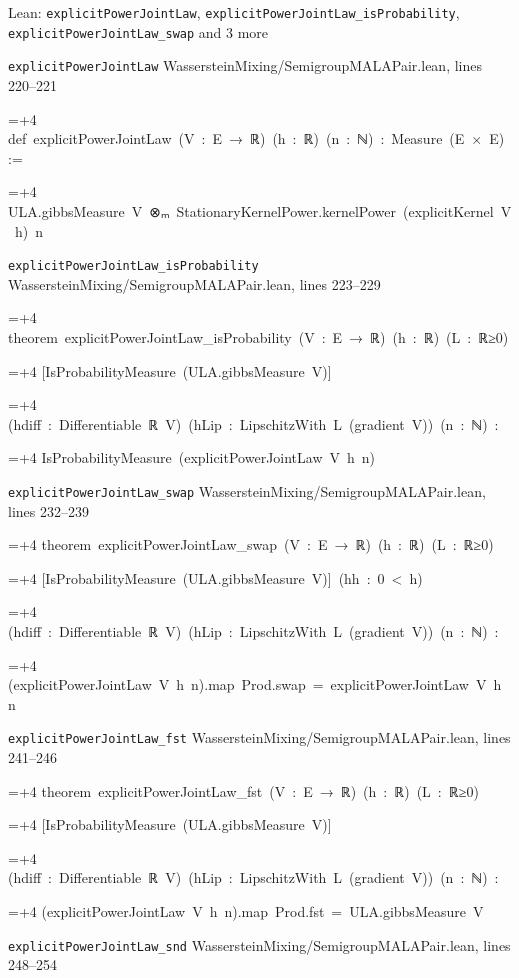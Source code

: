 \documentclass[11pt,a4paper]{report}
\newlength{\leancharwidth}
\newenvironment{leancode}{\par\smallskip\begingroup\ttfamily\footnotesize\raggedright
  \settowidth{\leancharwidth}{M}\setlength{\parskip}{0pt}\setlength{\parindent}{0pt}
  \frenchspacing}{\par\endgroup\smallskip}
\newcommand{\leanline}[2]{\hangindent=\dimexpr#1\leancharwidth+4\leancharwidth\relax
  \hangafter=1\noindent\hspace*{#1\leancharwidth}#2\par}
\newcommand{\leansource}[1]{\par{\footnotesize\color{leanmuted}#1}\par}
\begin{document}
\begin{leanbox}{Lean: \texttt{explicitPowerJointLaw}, \texttt{explicitPowerJointLaw\_\allowbreak{}isProbability}, \texttt{explicitPowerJointLaw\_\allowbreak{}swap} and 3 more}
\leansource{\texttt{explicitPowerJointLaw} \quad WassersteinMixing/\allowbreak{}SemigroupMALAPair.lean, lines 220–221}
\begin{leancode}
\leanline{0}{def\ explicitPowerJointLaw\ (V\ :\ E\ →\ ℝ)\ (h\ :\ ℝ)\ (n\ :\ ℕ)\ :\ Measure\ (E\ ×\ E)\ :=}
\leanline{2}{ULA.gibbsMeasure\ V\ ⊗ₘ\ StationaryKernelPower.kernelPower\ (explicitKernel\ V\ h)\ n}
\end{leancode}
\leansource{\texttt{explicitPowerJointLaw\_\allowbreak{}isProbability} \quad WassersteinMixing/\allowbreak{}SemigroupMALAPair.lean, lines 223–229}
\begin{leancode}
\leanline{0}{theorem\ explicitPowerJointLaw\_isProbability\ (V\ :\ E\ →\ ℝ)\ (h\ :\ ℝ)\ (L\ :\ ℝ≥0)}
\leanline{4}{[IsProbabilityMeasure\ (ULA.gibbsMeasure\ V)]}
\leanline{4}{(hdiff\ :\ Differentiable\ ℝ\ V)\ (hLip\ :\ LipschitzWith\ L\ (gradient\ V))\ (n\ :\ ℕ)\ :}
\leanline{4}{IsProbabilityMeasure\ (explicitPowerJointLaw\ V\ h\ n)}
\end{leancode}
\leansource{\texttt{explicitPowerJointLaw\_\allowbreak{}swap} \quad WassersteinMixing/\allowbreak{}SemigroupMALAPair.lean, lines 232–239}
\begin{leancode}
\leanline{0}{theorem\ explicitPowerJointLaw\_swap\ (V\ :\ E\ →\ ℝ)\ (h\ :\ ℝ)\ (L\ :\ ℝ≥0)}
\leanline{4}{[IsProbabilityMeasure\ (ULA.gibbsMeasure\ V)]\ (hh\ :\ 0\ <\ h)}
\leanline{4}{(hdiff\ :\ Differentiable\ ℝ\ V)\ (hLip\ :\ LipschitzWith\ L\ (gradient\ V))\ (n\ :\ ℕ)\ :}
\leanline{4}{(explicitPowerJointLaw\ V\ h\ n).map\ Prod.swap\ =\ explicitPowerJointLaw\ V\ h\ n}
\end{leancode}
\leansource{\texttt{explicitPowerJointLaw\_\allowbreak{}fst} \quad WassersteinMixing/\allowbreak{}SemigroupMALAPair.lean, lines 241–246}
\begin{leancode}
\leanline{0}{theorem\ explicitPowerJointLaw\_fst\ (V\ :\ E\ →\ ℝ)\ (h\ :\ ℝ)\ (L\ :\ ℝ≥0)}
\leanline{4}{[IsProbabilityMeasure\ (ULA.gibbsMeasure\ V)]}
\leanline{4}{(hdiff\ :\ Differentiable\ ℝ\ V)\ (hLip\ :\ LipschitzWith\ L\ (gradient\ V))\ (n\ :\ ℕ)\ :}
\leanline{4}{(explicitPowerJointLaw\ V\ h\ n).map\ Prod.fst\ =\ ULA.gibbsMeasure\ V}
\end{leancode}
\leansource{\texttt{explicitPowerJointLaw\_\allowbreak{}snd} \quad WassersteinMixing/\allowbreak{}SemigroupMALAPair.lean, lines 248–254}
\begin{leancode}

\end{leancode}
\end{leanbox}
\end{document}
